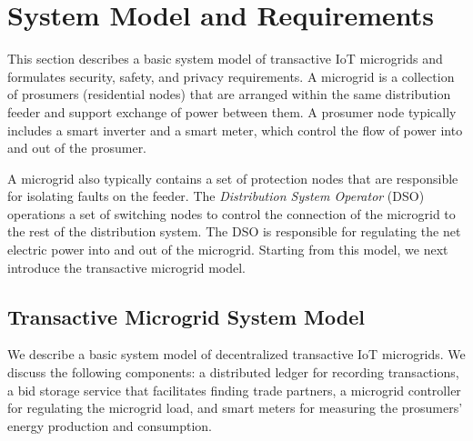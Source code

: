 \section{System Model and Requirements}

This section describes a basic system model of transactive IoT
microgrids and formulates security, safety, and privacy requirements.
A microgrid is a collection of prosumers (residential nodes) that are
arranged within the same distribution feeder and support exchange of
power between them. A prosumer node typically includes a smart
inverter and a smart meter, which control the flow of power into and
out of the prosumer. 

A microgrid also typically contains a set of protection nodes that are
responsible for isolating faults on the feeder.  The
\emph{Distribution System Operator} (DSO) operations a set of
switching nodes to control the connection of the microgrid to the rest
of the distribution system. The DSO is responsible for regulating the
net electric power into and out of the microgrid. Starting from this
model, we next introduce the transactive microgrid model.

\subsection{Transactive Microgrid System Model}
  We
describe a basic system model of decentralized transactive IoT
microgrids.  We discuss the following components: a distributed ledger
for recording transactions, a bid storage service that facilitates
finding trade partners, a microgrid controller for regulating the
microgrid load, and smart meters for measuring the prosumers' energy
production and consumption.

